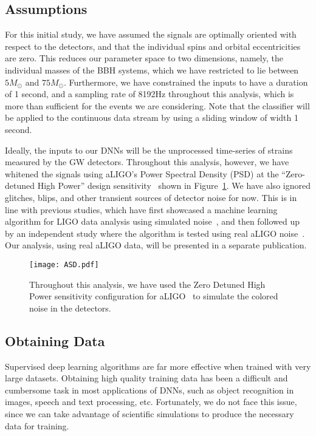 \documentclass[aps,prd,%
amsmath,floats,floatfix, twocolumn, superscriptaddress,nofootinbib,showpacs]{revtex4-1}
\def\Msun{M_\odot}
\begin{document}
\subsection*{Assumptions}
\label{assume}

For this initial study, we have assumed the signals are optimally oriented with respect to the detectors, and that the individual spins and orbital eccentricities are zero. This reduces our parameter space to two dimensions, namely, the individual masses of the BBH systems, which we have restricted to lie between $5\Msun$ and $75\Msun$. Furthermore, we have constrained the inputs to have a duration of 1 second, and a sampling rate of 8192Hz throughout this analysis, which is more than sufficient for the events we are considering.  Note that the
classifier will be applied to the continuous data stream by using a sliding window of width 1 second.

Ideally, the inputs to our DNNs will be the unprocessed time-series of strains measured by the GW detectors. Throughout this analysis, however, we have whitened the signals using aLIGO's Power Spectral Density (PSD) at the ``Zero-detuned High Power'' design sensitivity~\cite{ZDHP:2010} shown in Figure~\ref{ASD}. We have also ignored glitches, blips, and other transient sources of detector noise for now. This is in line with previous studies, which have first showcased a machine learning algorithm for LIGO data analysis using simulated noise~\cite{jade:2015CQGra,bambiann:2015PhRvD}, and then followed up by an independent study where the algorithm is tested using real aLIGO noise~\cite{jade1:2016}. Our analysis, using real aLIGO data, will be presented in a separate publication.

\begin{figure}
	\centering
	\texttt{[image: ASD.pdf]}
	\caption{Throughout this analysis, we have used the Zero Detuned High Power sensitivity configuration for aLIGO~\cite{ZDHP:2010} to simulate the colored noise in the detectors.}
	\label{ASD}
\end{figure}


\subsection*{Obtaining Data}


Supervised deep learning algorithms are far more effective when trained with very large datasets. Obtaining high quality training data has been a difficult and cumbersome task in most applications of DNNs, such as object recognition in images, speech and text processing, etc. Fortunately, we do not face this issue, since we can take advantage of scientific simulations to produce the necessary data for training. 
\end{document}
